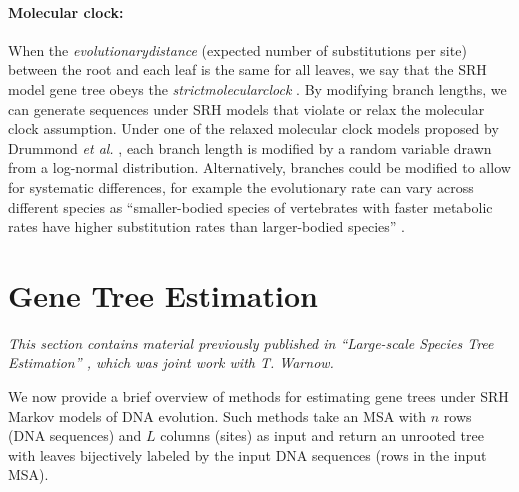 \paragraph{Molecular clock:}
When the \textit{\gls{evolutionarydistance}} (expected number of substitutions per site) between the root and each leaf is the same for all leaves, we say that the SRH model gene tree obeys the \textit{\gls{strictmolecularclock}} \cite{ho2008molecular}.
By modifying branch lengths, we can generate sequences under SRH models that violate or relax the molecular clock assumption.
Under one of the relaxed molecular clock models proposed by Drummond {\em et al.} \cite{drummond2006relaxed}, each branch length is modified by a random variable drawn from a log-normal distribution.
Alternatively, branches could be modified to allow for systematic differences, for example the evolutionary rate can vary across different species as ``smaller-bodied species of vertebrates with faster metabolic rates have higher substitution rates than larger-bodied species'' \cite{bromham2003modern}.

\section{Gene Tree Estimation}
\label{sec:background-gmethods}
{\em This section contains material previously published in ``Large-scale Species Tree Estimation'' \cite{molloy2020large}, which was joint work with T. Warnow.}

\vspace{12pt}

We now provide a brief overview of methods for estimating gene trees under \gls{SRH} Markov models of DNA evolution.
Such methods take an \gls{MSA} with $n$ rows (DNA sequences) and $L$ columns (\glspl{site}) as input and return an \gls{unrooted} tree with leaves bijectively labeled by the input DNA sequences (rows in the input MSA).

